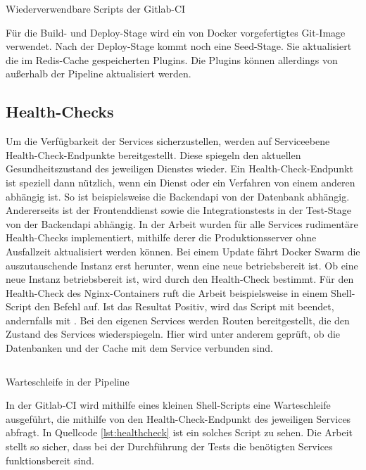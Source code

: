 \begin{listing}
    \inputminted{yaml}{snippets/yml/reusable_scripts.yml}
    \caption{Wiederverwendbare Scripts der Gitlab-CI}
    \label{lst:wiederverwendbarescriptsdergitlabci}
\end{listing}

Für die Build- und Deploy-Stage wird ein von Docker vorgefertigtes Git-Image verwendet. Nach der Deploy-Stage
kommt noch eine Seed-Stage. Sie aktualisiert die im Redis-Cache gespeicherten Plugins. Die Plugins können
allerdings von außerhalb der Pipeline aktualisiert werden.

\subsection{Health-Checks}
\label{subsec:healthcheck}
Um die Verfügbarkeit der Services sicherzustellen, werden auf
Serviceebene Health-Check-Endpunkte bereitgestellt. Diese spiegeln den aktuellen
Gesundheitszustand des jeweiligen Dienstes wieder. Ein Health-Check-Endpunkt
ist speziell dann nützlich, wenn ein Dienst oder ein Verfahren von einem anderen
abhängig ist. So ist beispielsweise die Backendapi von der Datenbank
abhängig. Andererseits ist der Frontenddienst sowie die Integrationstests
in der Test-Stage von der Backendapi abhängig. In der Arbeit wurden für alle Services
rudimentäre Health-Checks implementiert, mithilfe derer die Produktionsserver ohne Ausfallzeit
aktualisiert werden können. Bei einem Update fährt Docker Swarm die auszutauschende
Instanz erst herunter, wenn eine neue betriebsbereit ist. Ob eine neue Instanz betriebsbereit ist,
wird durch den Health-Check bestimmt. Für den Health-Check des Nginx-Containers ruft die Arbeit beispielsweise
in einem Shell-Script den Befehl  auf. Ist das Resultat Positiv, wird
das Script mit  beendet, andernfalls mit . Bei den eigenen Services werden 
Routen bereitgestellt, die den Zustand des Services wiederspiegeln. Hier wird unter anderem geprüft, ob die Datenbanken
und der Cache mit dem Service verbunden sind.

\begin{listing}
    \inputminted{sh}{snippets/sh/healthcheck.sh}
    \caption{Warteschleife in der Pipeline}
    \label{lst:healthcheck}
\end{listing}

In der Gitlab-CI wird mithilfe eines kleinen Shell-Scripts eine Warteschleife ausgeführt, die mithilfe von
 den Health-Check-Endpunkt des jeweiligen Services abfragt. In Quellcode \ref{lst:healthcheck}
ist ein solches Script zu sehen. Die Arbeit stellt so sicher, dass bei der Durchführung der Tests die
benötigten Services funktionsbereit sind.

